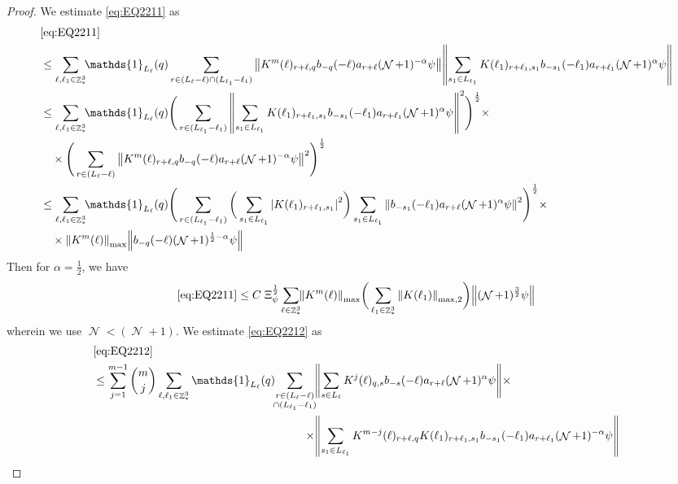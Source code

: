 \documentclass[sn-mathphys, Numbered ,a4paper]{sn-jnl}%
\DeclareMathOperator{\Z}{\mathbb{Z}}
\DeclareMathOperator{\NN}{\mathcal{N}}
\newcommand{\half}{\frac{1}{2}}
\theoremstyle{plain}
\theoremstyle{definition}
\theoremstyle{remark}
\theoremstyle{plain}
\theoremstyle{definition}
\theoremstyle{remark}
\begin{document}
{\begin{proof}
 We estimate \eqref{eq:EQ2211} as
 \begin{align}
 	&\eqref{eq:EQ2211}\nonumber\\
 	&\leq\sum\limits_{\ell,\ell_1 \in \Z^3_*} \!\!\mathds{1}_{L_\ell}(q) \sum\limits_{r\in (L_{\ell}-\ell) \cap (L_{\ell_1}-\ell_1)}    \norm{ K^{m}(\ell)_{r+\ell,q} b_{-q}(-\ell) a_{r+\ell} (\NN+1)^{-\alpha}\psi}\norm{ \sum\limits_{s_1 \in L_{\ell_1}} K(\ell_1)_{r+\ell_1,s_1} b_{-s_1}(-\ell_1)   a_{r+\ell_1} (\NN+1)^{\alpha}\psi } \nonumber\\
 	&\leq \sum\limits_{\ell,\ell_1 \in \Z^3_*} \!\!\mathds{1}_{L_\ell}(q) \Bigg( \sum\limits_{r\in (L_{\ell_1}-\ell_1)} \norm{\sum\limits_{s_1 \in L_{\ell_1}} K(\ell_1)_{r+\ell_1,s_1} b_{-s_1}(-\ell_1) a_{r+\ell_1} (\NN+1)^{\alpha}\psi}^2\Bigg)^\half \times\nonumber\\
 	&\quad \times \Bigg( \sum\limits_{r\in (L_{\ell}-\ell)}  \norm{K^{m}(\ell)_{r+\ell,q}  b_{-q}(-\ell) a_{r+\ell} (\NN+1)^{-\alpha}\psi }^2\Bigg)^\half \nonumber\\
 	&\leq \sum\limits_{\ell,\ell_1 \in \Z^3_*} \!\!\mathds{1}_{L_\ell}(q) \Bigg( \sum\limits_{r\in (L_{\ell_1}-\ell_1)} \bigg( \sum\limits_{s_1 \in L_{\ell_1}}\abs{K(\ell_1)_{r+\ell_1,s_1}}^2\bigg) \sum\limits_{s_1 \in L_{\ell_1}} \norm{ b_{-s_1}(-\ell_1)  a_{r+\ell} (\NN+1)^{\alpha}\psi}^2\Bigg)^\half \times\nonumber\\
 	&\quad \times  \norm{  K^{m}(\ell)}_{\mathrm{max}} \norm{b_{-q}(-\ell) (\NN+1)^{\half-\alpha}\psi } \nonumber
 \end{align}
 Then for $\alpha = \half$, we have 
 \begin{equation}
 	\eqref{eq:EQ2211}\leq C\;\Xi_{\psi}^\half \sum\limits_{\ell \in \Z^3_*} \!\! \norm{  K^{m}(\ell)}_{\mathrm{max}} \bigg(\sum\limits_{\ell_1 \in \Z^3_*} \norm{K(\ell_1)}_{\mathrm{max,2}} \bigg) \norm{ (\NN+1)^{\frac{3}{2}}\psi}  \label{eq:estEQ2211} 
 \end{equation}
 wherein we use $\NN<(\NN+1)$.
 We estimate \eqref{eq:EQ2212} as 
   \begin{alignat}{2}
 	&\eqref{eq:EQ2212}\nonumber\\
 	&\leq \sum\limits_{j=1}^{m-1} {{m}\choose j} \sum\limits_{\ell, \ell_1\in \Z^3_*} \mathds{1}_{L_{\ell}}(q)\!\! \begin{aligned}[t]
 		\sum\limits_{\substack{r\in (L_{\ell}-\ell) \\ \cap (L_{\ell_1}-\ell_1)}}\! &\norm{ \sum\limits_{s \in L_\ell} K^{j}(\ell)_{q,s}  b_{-s}(-\ell) a_{r+\ell} (\NN+1)^{\alpha}\psi}\times\nonumber \\\times &\norm{\sum\limits_{s_1 \in L_{\ell_1}} K^{m-j}(\ell)_{r+\ell,q} K(\ell_1)_{r+\ell_1,s_1} b_{-s_1}(-\ell_1)  a_{r+\ell_1} (\NN+1)^{-\alpha}\psi }

\end{aligned}
\end{alignat}
\end{proof}}
\end{document}
